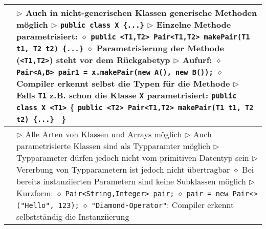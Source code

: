 \begin{longtable}{ | p{4cm} p{13.5cm} | }
	\makecell[l]{Generische Methoden} & \makecell[l]{$\rhd$ Auch in \textbf{nicht-generischen Klassen} generische Methoden möglich \\
	$\rhd$ \texttt{public class X \{...\}} \\
	$\rhd$ Einzelne Methode parametrisiert: \\
	\hspace{0.4cm} $\diamond$ \texttt{public <T1,T2> Pair<T1,T2> makePair(T1 t1, T2 t2) \{...\}} \\
	\hspace{0.4cm} $\diamond$ \textbf{Parametrisierung} der Methode (\texttt{<T1,T2>}) steht vor dem Rückgabetyp \\
	$\rhd$ Aufurf: \\
	\hspace{0.4cm} $\diamond$ \texttt{Pair<A,B> pair1 = x.makePair(new A(), new B());} \\
	\hspace{0.4cm} $\diamond$ Compiler erkennt selbst die Typen für die Methode \\
	$\rhd$ Falls \texttt{T1} z.B. schon die Klasse \texttt{X} parametrisiert: \\
	\hspace{0.8cm} \texttt{public class X <T1>} \{ \\
	\hspace{1.2cm} \texttt{public <T2> Pair<T1,T2> makePair(T1 t1, T2 t2) \{...\} } \\
	\hspace{0.8cm} \} } \\ \hline 

	\makecell[l]{Typparameter} & \makecell[l]{$\rhd$ Alle Arten von Klassen und Arrays möglich \\
	$\rhd$ Auch parametrisierte Klassen sind als Typparamter möglich \\
	$\rhd$ Typparameter dürfen jedoch nicht vom primitiven Datentyp sein \\
	$\rhd$ Vererbung von Typparametern ist jedoch nicht übertragbar \\ 
	\hspace{0.4cm} $\diamond$ Bei bereits instanziierten Parametern sind keine Subklassen möglich \\
	$\rhd$ Kurzform: \\
	\hspace{0.4cm} $\diamond$ \texttt{Pair<String,Integer> pair;} \\
	\hspace{0.4cm} $\diamond$ \texttt{pair = new Pair<> ("Hello", 123);} \\
	\hspace{0.4cm} $\diamond$ \texttt{"Diamond-Operator"}: Compiler erkennt selbstständig die Instanziierung } \\ \hline


\end{longtable}
